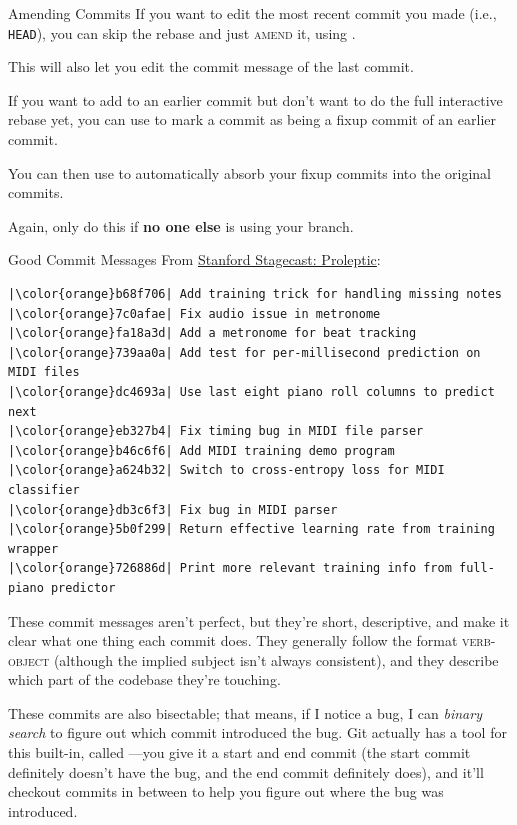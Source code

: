 \begin{frame}[fragile]{Amending Commits}
  If you want to edit the most recent commit you made (i.e., \texttt{HEAD}),
  you can skip the rebase and just \textsc{amend} it, using .

  This will also let you edit the commit message of the last commit.
  \pause

  If you want to add to an earlier commit but don't want to do the full
  interactive rebase yet, you can use  to mark a
  commit as being a fixup commit of an earlier commit.

  You can then use  to
  automatically absorb your fixup commits into the original commits.
  \pause

  Again, only do this if \textbf{no one else} is using your branch.
\end{frame}

\begin{frame}[fragile]{Good Commit Messages}
  \vspace{-0.5em}
   {
    From \href{https://github.com/stanford-stagecast/proleptic}{Stanford Stagecast: Proleptic}:
  }
  \begin{verbatim}
|\color{orange}b68f706| Add training trick for handling missing notes
|\color{orange}7c0afae| Fix audio issue in metronome
|\color{orange}fa18a3d| Add a metronome for beat tracking
|\color{orange}739aa0a| Add test for per-millisecond prediction on MIDI files
|\color{orange}dc4693a| Use last eight piano roll columns to predict next
|\color{orange}eb327b4| Fix timing bug in MIDI file parser
|\color{orange}b46c6f6| Add MIDI training demo program
|\color{orange}a624b32| Switch to cross-entropy loss for MIDI classifier
|\color{orange}db3c6f3| Fix bug in MIDI parser
|\color{orange}5b0f299| Return effective learning rate from training wrapper
|\color{orange}726886d| Print more relevant training info from full-piano predictor
  \end{verbatim}
\end{frame}

These commit messages aren't perfect, but they're short, descriptive, and make
it clear what one thing each commit does.  They generally follow the format
\textsc{verb}-\textsc{object} (although the implied subject isn't always
consistent), and they describe which part of the codebase they're touching.

These commits are also bisectable; that means, if I notice a bug, I can
\textit{binary search} to figure out which commit introduced the bug. Git
actually has a tool for this built-in, called ---you give it a
start and end commit (the start commit definitely doesn't have the bug, and the
end commit definitely does), and it'll checkout commits in between to help you
figure out where the bug was introduced.

